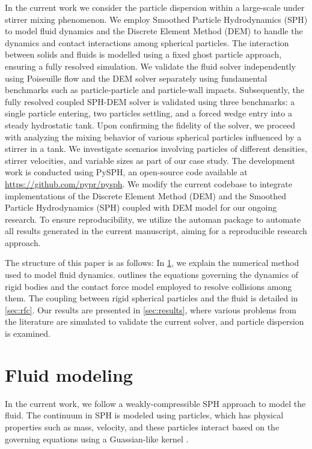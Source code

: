 \documentclass[preprint,12pt]{elsarticle}
\begin{document}
In the current work we consider the particle dispersion within a large-scale
under stirrer mixing phenomenon. We employ Smoothed Particle Hydrodynamics
(SPH) to model fluid dynamics and the Discrete Element Method (DEM) to handle
the dynamics and contact interactions among spherical particles. The
interaction between solids and fluids is modelled using a fixed ghost particle
approach, ensuring a fully resolved simulation. We validate the fluid solver
independently using Poiseuille flow and the DEM solver separately using
fundamental benchmarks such as particle-particle and particle-wall
impacts. Subsequently, the fully resolved coupled SPH-DEM solver is validated
using three benchmarks: a single particle entering, two particles settling,
and a forced wedge entry into a steady hydrostatic tank. Upon confirming the
fidelity of the solver, we proceed with analyzing the mixing behavior of
various spherical particles influenced by a stirrer in a tank. We investigate
scenarios involving particles of different densities, stirrer velocities, and
variable sizes as part of our case study. The development work is conducted
using PySPH\cite{ramachandran2021pysph}, an open-source code available at
\url{https://github.com/pypr/pysph}.  We modify the current codebase to
integrate implementations of the Discrete Element Method (DEM) and the
Smoothed Particle Hydrodynamics (SPH) coupled with DEM model for our ongoing
research. To ensure reproducibility, we utilize the automan package
\cite{ramachandran2018automan} to automate all results generated in the
current manuscript, aiming for a reproducible research approach.



The structure of this paper is as follows: In
\cref{sec:fluid-modeling}, we explain the numerical method used to model fluid
dynamics.  outlines the equations governing the dynamics
of rigid bodies and the contact force model employed to resolve collisions
among them. The coupling between rigid spherical particles and the fluid is
detailed in \cref{sec:rfc}. Our results are presented in
\cref{sec:results}, where various problems from the literature are simulated to
validate the current solver, and particle dispersion is examined.



\FloatBarrier%
\section{Fluid modeling}
\label{sec:fluid-modeling}
In the current work, we follow a weakly-compressible SPH approach to model the
fluid. The continuum in SPH is modeled using particles, which has physical
properties such as mass, velocity, and these particles interact based on the
governing equations using a Guassian-like kernel
\cite{monaghan-review:2005,morris1997modeling}.
\end{document}
